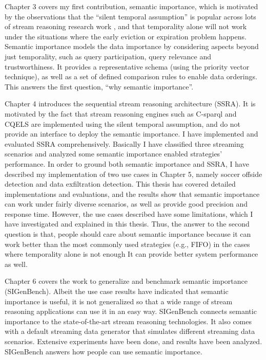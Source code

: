 Chapter 3 covers my first contribution, semantic importance, which is motivated by the observations that the ``silent temporal assumption'' is popular across lots of stream reasoning research work \cite{barbieri2010stream} \cite{stuckenschmidt2010towards} \cite{golab2003processing} \cite{barbieri2010deductive}, and that temporality alone will not work under the situations where the early eviction or expiration problem happens. 
Semantic importance models the data importance by considering aspects beyond just temporality, such as query participation, query relevance and trustworthiness. 
It provides a representative schema (using the priority vector technique), as well as a set of defined comparison rules to enable data orderings. 
This answers the first question, ``why semantic importance''.

Chapter 4 introduces the sequential stream reasoning architecture (SSRA). 
It is motivated by the fact that stream reasoning engines such as C-sparql and CQELS are implemented using the silent temporal assumption, and do not provide an interface to deploy the semantic importance. 
I have implemented and evaluated SSRA comprehensively.
Basically I have classified three streaming scenarios and analyzed some semantic importance enabled strategies' performance. 
In order to ground both semantic importance and SSRA, I have described my implementation of two use cases in Chapter 5, namely soccer offside detection and data exfiltration detection.
This thesis has covered detailed implementations and evaluations, and the results show that semantic importance can work under fairly diverse scenarios, as well as provide good precision and response time. 
However, the use cases described have some limitations, which I have investigated and explained in this thesis. 
Thus, the answer to the second question is that, people should care about semantic importance because it can work better than the most commonly used strategies (e.g., FIFO) in the cases where temporality alone is not enough
It can provide better system performance as well. 

Chapter 6 covers the work to generalize and benchmark semantic importance (SIGenBench).
Albeit the use case results have indicated that semantic importance is useful, it is not generalized so that a wide range of stream reasoning applications can use it in an easy way.
SIGenBench connects semantic importance to the state-of-the-art stream reasoning technologies.
It also comes with a default streaming data generator that simulates different streaming data scenarios. 
Extensive experiments have been done, and results have been analyzed. 
SIGenBench answers how people can use semantic importance.
%
